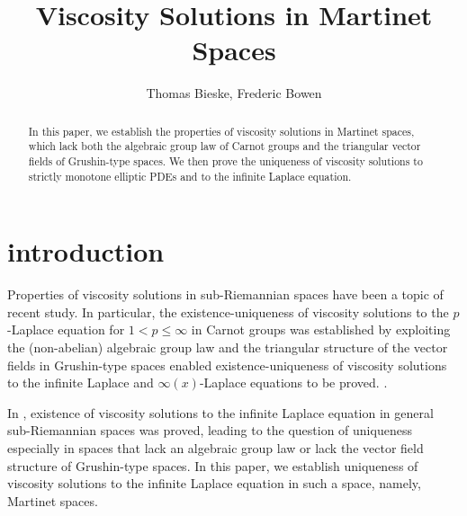 \documentclass[reqno]{amsart}
\begin{document}
\title{Viscosity Solutions in Martinet Spaces}

\author{Thomas Bieske, Frederic Bowen}

\address{Thomas Bieske \newline
Department of Mathematics and Statistics,
University of South Florida,
Tampa, FL  33620-5700, USA}

\address{Frederic Bowen \newline
College of Arts and Sciences,
University of South Florida,
Tampa, FL  33620-5700, USA}


\begin{abstract}
In this paper, we establish the properties of viscosity solutions in Martinet spaces, which lack both the algebraic group law of Carnot groups and the triangular vector fields of Grushin-type spaces. We then prove the uniqueness of viscosity solutions to strictly monotone elliptic PDEs and to the infinite Laplace equation. 
\end{abstract}

\maketitle
{}
\newtheorem{theorem}{Theorem}[section]
\newtheorem{corollary}[theorem]{Corollary}
\newtheorem{lemma}[theorem]{Lemma}
\newtheorem{proposition}[theorem]{Proposition}
\newtheorem{remark}[theorem]{Remark}
\newtheorem*{quest}{Main Question}
\newtheorem*{obs}{Observation}
\newtheorem{definition}{Definition}
\allowdisplaybreaks
\section{introduction}
Properties of viscosity solutions in sub-Riemannian spaces have been a topic of recent study. In particular, the existence-uniqueness of viscosity solutions to the $p$-Laplace equation for $1<p\leq \infty$ in Carnot groups was established by exploiting the (non-abelian) algebraic group law \cite{B:MP} and the triangular structure of the vector fields in Grushin-type spaces enabled existence-uniqueness of viscosity solutions to the infinite Laplace and $\infty(x)$-Laplace equations to be proved. \cite{B:GS, B:IX}.  


In \cite{CGPV}, existence of viscosity solutions to the infinite Laplace equation in general sub-Riemannian spaces was proved, leading to the question of uniqueness especially in spaces that lack an algebraic group law or lack the vector field structure of Grushin-type spaces. In this paper, we establish uniqueness of viscosity solutions to the infinite Laplace equation in such a space, namely, Martinet spaces.  
\end{document}
